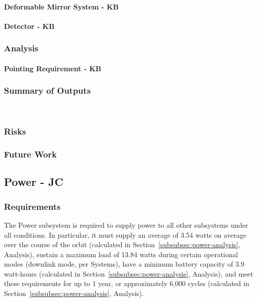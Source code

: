 \documentclass[12pt]{article}
\begin{document}
                        \paragraph{Deformable Mirror System - KB} 

                        \paragraph{Detector - KB}

			\subsubsection{Analysis}
                        \paragraph{Pointing Requirement - KB}

			\subsubsection{Summary of Outputs}\
			\subsubsection{Risks}

			\subsubsection{Future Work}
		\subsection{Power - JC}
			\subsubsection{Requirements}
			The Power subsystem is required to supply power to all other subsystems under all conditions.  In particular, it must supply an average of 3.54 watts on average over the course of the orbit (calculated in Section~\ref{subsubsec:power-analysis}, Analysis), sustain a maximum load of 13.84 watts during certain operational modes (downlink mode, per Systems), have a minimum battery capacity of 3.9 watt-hours (calculated in Section~\ref{subsubsec:power-analysis}, Analysis), and meet these requirements for up to 1 year, or approximately 6,000 cycles (calculated in Section~\ref{subsubsec:power-analysis}, Analysis).
			
\end{document}
